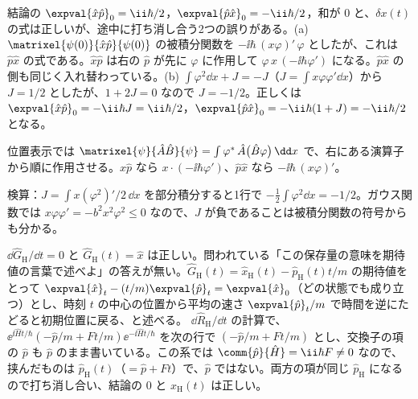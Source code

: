 \begin{kotaeran}
   結論の $\expval{\hat{x}\hat{p}}_{0}=\ii\hbar/2$，$\expval{\hat{p}\hat{x}}_{0}=-\ii\hbar/2$，和が $0$ と、$\delta x(t)$ の式は正しいが、途中に打ち消し合う2つの誤りがある。(a) $\matrixel{\psi(0)}{\hat{x}\hat{p}}{\psi(0)}$ の被積分関数を $-\ii\hbar\,(x\varphi)'\,\varphi$ としたが、これは $\hat{p}\hat{x}$ の式である。$\hat{x}\hat{p}$ は右の $\hat{p}$ が先に $\varphi$ に作用して $\varphi\,x\,(-\ii\hbar\varphi')$ になる。$\hat{p}\hat{x}$ の側も同じく入れ替わっている。(b) $\int\varphi^{2}\dd x+J=-J$（$J=\int x\varphi\varphi'\dd x$）から $J=1/2$ としたが、$1+2J=0$ なので $J=-1/2$。正しくは $\expval{\hat{x}\hat{p}}_{0}=-\ii\hbar J=\ii\hbar/2$，$\expval{\hat{p}\hat{x}}_{0}=-\ii\hbar(1+J)=-\ii\hbar/2$ となる。
\end{kotaeran}
\begin{rikai}
  \item 位置表示では $\matrixel{\psi}{\hat{A}\hat{B}}{\psi}=\int\varphi^{*}\,\hat{A}\bigl(\hat{B}\varphi\bigr)\,\dd x$ で、右にある演算子から順に作用させる。$\hat{x}\hat{p}$ なら $x\cdot(-\ii\hbar\varphi')$、$\hat{p}\hat{x}$ なら $-\ii\hbar\,(x\varphi)'$。
  \item 検算：$J=\int x(\varphi^{2})'/2\,\dd x$ を部分積分すると1行で $-\frac{1}{2}\int\varphi^{2}\dd x=-1/2$。ガウス関数では $x\varphi\varphi'=-b^{2}x^{2}\varphi^{2}\le0$ なので、$J$ が負であることは被積分関数の符号からも分かる。
\end{rikai}
\begin{kotaeran}
   $\dd\hat{G}_{\mathrm{H}}/\dd t=0$ と $\hat{G}_{\mathrm{H}}(t)=\hat{x}$ は正しい。問われている「この保存量の意味を期待値の言葉で述べよ」の答えが無い。$\hat{G}_{\mathrm{H}}(t)=\hat{x}_{\mathrm{H}}(t)-\hat{p}_{\mathrm{H}}(t)t/m$ の期待値をとって $\expval{\hat{x}}_{t}-(t/m)\expval{\hat{p}}_{t}=\expval{\hat{x}}_{0}$（どの状態でも成り立つ）とし、時刻 $t$ の中心の位置から平均の速さ $\expval{\hat{p}}_{t}/m$ で時間を逆にたどると初期位置に戻る、と述べる。
   $\dd\hat{R}_{\mathrm{H}}/\dd t$ の計算で、$\ee^{\ii\hat{H}t/\hbar}(-\hat{p}/m+Ft/m)\ee^{-\ii\hat{H}t/\hbar}$ を次の行で $(-\hat{p}/m+Ft/m)$ とし、交換子の項の $\hat{p}$ も $\hat{p}$ のまま書いている。この系では $\comm{\hat{p}}{\hat{H}}=\ii\hbar F\neq0$ なので、挟んだものは $\hat{p}_{\mathrm{H}}(t)$（$=\hat{p}+Ft$）で、$\hat{p}$ ではない。両方の項が同じ $\hat{p}_{\mathrm{H}}$ になるので打ち消し合い、結論の $0$ と $\hat{x}_{\mathrm{H}}(t)$ は正しい。
\end{kotaeran}
